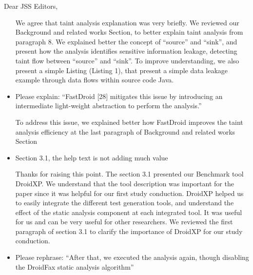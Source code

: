 \documentclass[12pt,english]{scrlttr2}
\begin{document}
\begin{letter}{Dear JSS Editors,}
\begin{itemize}
\vspace{0.2cm}

{\color{blue}{\bf Answer.} We agree that taint analysis explanation was very briefly. We reviewed our Background and related works Section, to better explain taint analysis from paragraph 8. We explained better the concept of ``source'' and ``sink'', and present how the analysis identifies sensitive information leakage, detecting taint flow between “source” and “sink”. To improve understanding, we also present a simple Listing (Listing 1), that present a simple data leakage example through data flows within source code Java. }


\vspace{0.2cm}

\item Please explain:
``FastDroid [28] mitigates this issue by introducing an intermediate light-weight abstraction to perform the analysis.''


\vspace{0.2cm}

{\color{blue}{\bf Answer.} To address this issue, we explained better how FastDroid improves the taint analysis efficiency at the last paragraph of Background and related works Section}

\vspace{0.2cm}

\item Section 3.1, the help text is not adding much value

\vspace{0.2cm}

{\color{blue}{\bf Answer.} Thanks for raising this point. The section 3.1 presented our Benchmark tool DroidXP. We understand that the tool description was important for the paper since it was helpful for our first study conduction. DroidXP helped us to easily integrate the different test generation tools, and understand the effect of the static analysis component at each integrated tool. It was useful for us and can be very useful for other researchers. We
reviewed the first paragraph of section 3.1 to clarify the importance of DroidXP for our study conduction.}


\vspace{0.2cm}

\item Please rephrase: ``After that, we executed the analysis again, though disabling the DroidFax static analysis algorithm''

\vspace{0.2cm}


\end{itemize}
\end{letter}
\end{document}
